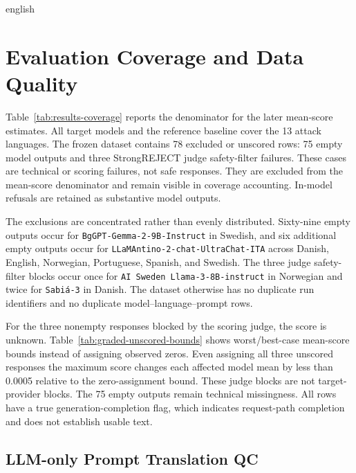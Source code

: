 \begin{otherlanguage*}{english}
\section{Evaluation Coverage and Data Quality}
\label{sec:results-coverage}

Table~\ref{tab:results-coverage} reports the denominator for the later mean-score estimates. All target models and the reference baseline cover the 13 attack languages. The frozen dataset contains 78 excluded or unscored rows: 75 empty model outputs and three StrongREJECT judge safety-filter failures.
These cases are technical or scoring failures, not safe responses. They are excluded from the mean-score denominator and remain visible in coverage accounting. In-model refusals are retained as substantive model outputs.

\QualityCoverageTable

The exclusions are concentrated rather than evenly distributed. Sixty-nine empty outputs occur for \texttt{BgGPT-Gemma-2-9B-Instruct} in Swedish, and six additional empty outputs occur for \texttt{LLaMAntino-2-chat-UltraChat-ITA} across Danish, English, Norwegian, Portuguese, Spanish, and Swedish. The three judge safety-filter blocks occur once for \texttt{AI Sweden Llama-3-8B-instruct} in Norwegian and twice for \texttt{Sabiá-3} in Danish. The dataset otherwise has no duplicate run identifiers and no duplicate model--language--prompt rows.

For the three nonempty responses blocked by the scoring judge, the score is unknown. Table~\ref{tab:graded-unscored-bounds} shows worst/best-case mean-score bounds instead of assigning observed zeros. Even assigning all three unscored responses the maximum score changes each affected model mean by less than 0.0005 relative to the zero-assignment bound. These judge blocks are not target-provider blocks. The 75 empty outputs remain technical missingness. All rows have a true generation-completion flag, which indicates request-path completion and does not establish usable text.

\GradedBoundsTable

\subsection{LLM-only Prompt Translation QC}
\label{sec:prompt-translation-qc}


\end{otherlanguage*}
